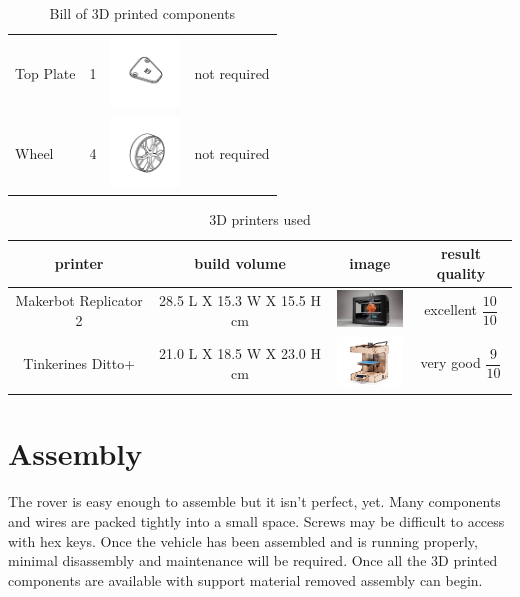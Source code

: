 \documentclass[12pt,titlepage,oneside]{memoir}
\begin{document}
\begin{table}
\begin{tabular}{p{5cm} | c | c | c}
Top Plate & 1 & \includegraphics[width=70px]{diagram/Top_Plate.pdf} & not required\\
Wheel & 4 & \includegraphics[width=70px]{diagram/Wheel.pdf} & not required
\end{tabular}
\caption{Bill of 3D printed components}
\label{table:3Dprint}
\end{table}

\begin{table}
\begin{tabular}{c | c | c | c}
printer & build volume & image& result quality\\
\hline
Makerbot Replicator 2 & 28.5 L X 15.3 W X 15.5 H cm & \includegraphics[width=70px]{picture/makerbotrep2.jpg} & excellent $\dfrac{10}{10}$\\
Tinkerines Ditto+ & 21.0 L X 18.5 W X 23.0 H cm  & \includegraphics[width=70px]{picture/ditto.jpg} & very good $\dfrac{9}{10}$\\
 
\end{tabular}
\caption{3D printers used}
\label{table:3Dprint}
\end{table}




\chapter{Assembly}

The rover is easy enough to assemble but it isn't perfect, yet. Many components and wires are packed tightly into a small space. Screws may be difficult to access with hex keys. Once the vehicle has been assembled and is running properly, minimal disassembly and maintenance will be required. Once all the 3D printed components are available with support material removed assembly can begin.\\
\end{document}

